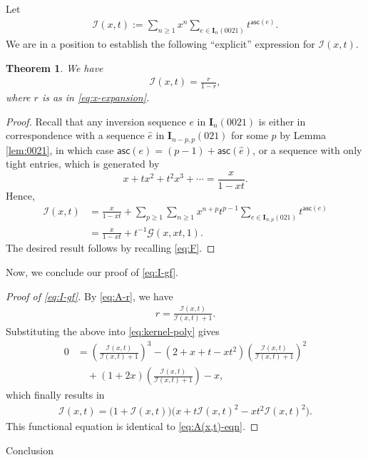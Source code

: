 \documentclass[reqno]{amsart}
\makeatletter
\numberwithin{equation}{section}
\theoremstyle{plain}
\newtheorem{theorem}{Theorem}[section]
\theoremstyle{definition}
\theoremstyle{named}
\def\section{\@startsection{section}{1}%
  \z@{.7\linespacing\@plus\linespacing}{.5\linespacing}%
  {\normalfont\scshape}}%
\newcommand{\bI}{\mathbf{I}}
\newcommand{\asc}{\mathsf{asc}}
\newcommand{\cG}{\mathcal{G}}
\newcommand{\cI}{\mathcal{I}}
\makeatother
\begin{document}
Let
\begin{align}
	\cI(x,t):=\sum_{n\ge 1}x^n\sum_{e\in\bI_n(0021)}t^{\asc(e)}.
\end{align}
We are in a position to establish the following ``explicit'' expression for $\cI(x,t)$.

\begin{theorem}
	We have
	\begin{align}\label{eq:A-r}
		\cI(x,t) = \frac{r}{1-r},
	\end{align}
	where $r$ is as in \eqref{eq:x-expansion}.
\end{theorem}

\begin{proof}
	Recall that any inversion sequence $e$ in $\bI_n(0021)$ is either in correspondence with a sequence $\hat{e}$ in $\bI_{n-p,p}(021)$ for some $p$ by Lemma \ref{lem:0021}, in which case $\asc(e)=(p-1)+\asc(\hat{e})$, or a sequence with only tight entries, which is generated by
	$$x+t x^2+t^2 x^3+\cdots = \frac{x}{1-xt}.$$
	Hence,
	\begin{align*}
		\cI(x,t)&=\frac{x}{1-xt}+\sum_{p\ge 1}\sum_{n\ge 1}x^{n+p}t^{p-1} \sum_{e\in\bI_{n,p}(021)}t^{\asc(e)}\\
		&=\frac{x}{1-xt}+t^{-1}\cG(x,xt,1).
	\end{align*}
	The desired result follows by recalling \eqref{eq:F}.
\end{proof}

Now, we conclude our proof of \eqref{eq:I-gf}.

\begin{proof}[Proof of \eqref{eq:I-gf}]
	By \eqref{eq:A-r}, we have
	\begin{align*}
		r=\frac{\cI(x,t)}{\cI(x,t)+1}.
	\end{align*}
	Substituting the above into \eqref{eq:kernel-poly} gives
	\begin{align*}
		0&=\left(\frac{\cI(x,t)}{\cI(x,t)+1}\right)^3-(2+x+t-xt^2)\left(\frac{\cI(x,t)}{\cI(x,t)+1}\right)^2\\
		&\quad+(1+2x)\left(\frac{\cI(x,t)}{\cI(x,t)+1}\right)-x,
	\end{align*}
	which finally results in
	\begin{align*}
		\cI(x,t)=\big(1+\cI(x,t)\big)\big(x+t \cI(x,t)^2 - xt^2 \cI(x,t)^2\big).
	\end{align*}
	This functional equation is identical to \eqref{eq:A(x,t)-eqn}.
\end{proof}

\section{Conclusion}
\end{document}
